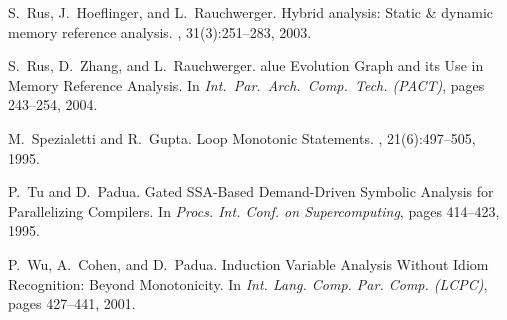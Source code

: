 \documentclass[10pt,nocopyrightspace]{sigplanconf}
\begin{document}
\begin{thebibliography}{}
S.~Rus, J.~Hoeflinger, and L.~Rauchwerger.
\newblock Hybrid analysis: Static \& dynamic memory reference analysis.
, 31(3):251--283, 2003.

S.~Rus, D.~Zhang, and L.~Rauchwerger.
alue {E}volution {G}raph and its {U}se in {M}emory {R}eference
  {A}nalysis.
\newblock In {\em Int.~Par.~Arch.~Comp.~Tech. (PACT)}, pages 243--254, 2004.

M.~Spezialetti and R.~Gupta.
\newblock Loop {M}onotonic {S}tatements.
, 21(6):497--505, 1995.

P.~Tu and D.~Padua.
\newblock Gated {SSA}-{B}ased {D}emand-{D}riven {S}ymbolic {A}nalysis for
  {P}arallelizing {C}ompilers.
\newblock In {\em Procs. Int. Conf. on Supercomputing}, pages 414--423, 1995.

P.~Wu, A.~Cohen, and D.~Padua.
\newblock Induction {V}ariable {A}nalysis {W}ithout {I}diom {R}ecognition:
  {B}eyond {M}onotonicity.
\newblock In {\em Int. Lang. Comp. Par. Comp. (LCPC)}, pages 427--441, 2001.

\end{thebibliography}

%
\end{document}
